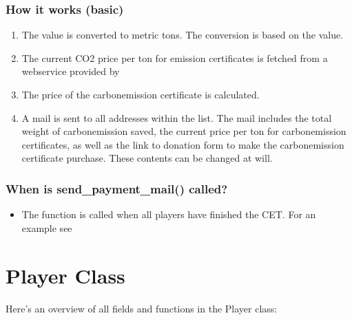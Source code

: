 \documentclass[letterpaper,10pt,english]{sphinxmanual}
\begin{document}
\subsubsection{How it works (basic)}
\label{\detokenize{Subsession_fields:how-it-works-basic}}\begin{enumerate}
%
\item {} 
The  value is converted to metric tons. The conversion is based on the  value.

\item {} 
The current CO2 price per ton for emission certificates is fetched from a webservice provided by 

\item {} 
The price of the carbon\sphinxhyphen{}emission certificate is calculated.

\item {} 
A mail is sent to all addresses within the  list.
The mail includes the total weight of carbon\sphinxhyphen{}emission saved,
the current price per ton for carbon\sphinxhyphen{}emission certificates, as well as the link to  donation form
to make the carbon\sphinxhyphen{}emission certificate purchase. These contents can be changed at will.

\end{enumerate}


\subsubsection{When is send\_payment\_mail() called?}
\label{\detokenize{Subsession_fields:when-is-send-payment-mail-called}}\label{\detokenize{Subsession_fields:mail-call-ref}}\begin{itemize}
\item {} 
The function is called when all players have finished the CET. For an example see {\hyperref[\detokenize{pages:results}]{}}

\end{itemize}




\section{Player Class}
\label{\detokenize{Player_fields:player-class}}\label{\detokenize{Player_fields::doc}}
Here’s an overview of all fields and functions in the Player class:
\end{document}
